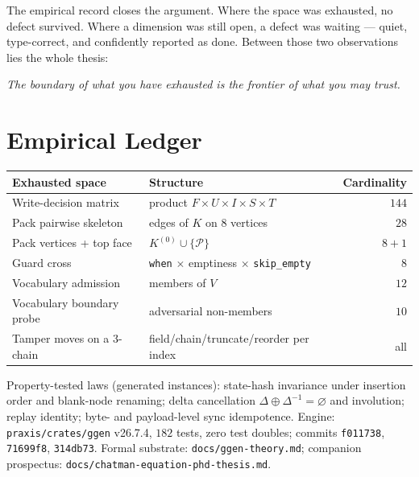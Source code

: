 \documentclass[11pt,a4paper]{report}
\theoremstyle{definition}
\theoremstyle{remark}
\newcommand{\Packs}{\mathcal{P}}
\newcommand{\del}{\Delta}
\begin{document}
The empirical record closes the argument. Where the space was exhausted, no
defect survived. Where a dimension was still open, a defect was waiting ---
quiet, type-correct, and confidently reported as done. Between those two
observations lies the whole thesis:

\begin{center}
\emph{The boundary of what you have exhausted is the frontier of what you
may trust.}
\end{center}

\appendix
\chapter{Empirical Ledger}

\begin{center}
\begin{tabular}{@{}llr@{}}
\toprule
Exhausted space & Structure & Cardinality \\
\midrule
Write-decision matrix & product $F{\times}U{\times}I{\times}S{\times}T$ & $144$ \\
Pack pairwise skeleton & edges of $K$ on $8$ vertices & $28$ \\
Pack vertices + top face & $K^{(0)} \cup \{\Packs\}$ & $8 + 1$ \\
Guard cross & \texttt{when} $\times$ emptiness $\times$ \texttt{skip\_empty} & $8$ \\
Vocabulary admission & members of $V$ & $12$ \\
Vocabulary boundary probe & adversarial non-members & $10$ \\
Tamper moves on a 3-chain & field/chain/truncate/reorder per index & all \\
\bottomrule
\end{tabular}
\end{center}

\noindent
Property-tested laws (generated instances): state-hash invariance under
insertion order and blank-node renaming; delta cancellation
$\del \oplus \del^{-1} = \varnothing$ and involution; replay identity;
byte- and payload-level sync idempotence. Engine: \texttt{praxis/crates/ggen}
v26.7.4, $182$ tests, zero test doubles; commits
\texttt{f011738}, \texttt{71699f8}, \texttt{314db73}. Formal substrate:
\texttt{docs/ggen-theory.md}; companion prospectus:
\texttt{docs/chatman-equation-phd-thesis.md}.
\end{document}
